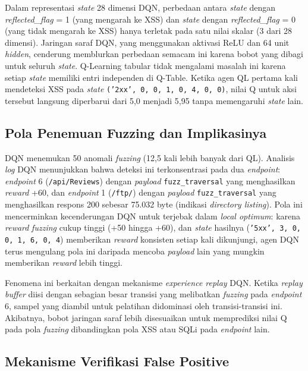 Dalam representasi \textit{state} 28 dimensi DQN, perbedaan antara \textit{state} dengan \textit{reflected\_flag} = 1 (yang mengarah ke XSS) dan \textit{state} dengan \textit{reflected\_flag} = 0 (yang tidak mengarah ke XSS) hanya terletak pada satu nilai skalar (3 dari 28 dimensi). Jaringan saraf DQN, yang menggunakan aktivasi ReLU dan 64 unit \textit{hidden}, cenderung memblurkan perbedaan semacam ini karena bobot yang dibagi untuk seluruh \textit{state}. Q-Learning tabular tidak mengalami masalah ini karena setiap \textit{state} memiliki entri independen di Q-Table. Ketika agen QL pertama kali mendeteksi XSS pada \textit{state} \texttt{('2xx', 0, 0, 1, 0, 4, 0, 0)}, nilai Q untuk aksi tersebut langsung diperbarui dari 5,0 menjadi 5,95 tanpa memengaruhi \textit{state} lain.

\subsection{Pola Penemuan Fuzzing dan Implikasinya}

DQN menemukan 50 anomali \textit{fuzzing} (12,5 kali lebih banyak dari QL). Analisis \textit{log} DQN menunjukkan bahwa deteksi ini terkonsentrasi pada dua \textit{endpoint}: \textit{endpoint} 6 (\texttt{/api/Reviews}) dengan \textit{payload} \texttt{fuzz\_traversal} yang menghasilkan \textit{reward} +60, dan \textit{endpoint} 1 (\texttt{/ftp/}) dengan \textit{payload} \texttt{fuzz\_traversal} yang menghasilkan respons 200 sebesar 75.032 byte (indikasi \textit{directory listing}). Pola ini mencerminkan kecenderungan DQN untuk terjebak dalam \textit{local optimum}: karena \textit{reward} \textit{fuzzing} cukup tinggi (+50 hingga +60), dan \textit{state} hasilnya (\texttt{'5xx', 3, 0, 0, 1, 6, 0, 4}) memberikan \textit{reward} konsisten setiap kali dikunjungi, agen DQN terus mengulang pola ini daripada mencoba \textit{payload} lain yang mungkin memberikan \textit{reward} lebih tinggi.

Fenomena ini berkaitan dengan mekanisme \textit{experience replay} DQN. Ketika \textit{replay buffer} diisi dengan sebagian besar transisi yang melibatkan \textit{fuzzing} pada \textit{endpoint} 6, sampel yang diambil untuk pelatihan didominasi oleh transisi-transisi ini. Akibatnya, bobot jaringan saraf lebih disesuaikan untuk memprediksi nilai Q pada pola \textit{fuzzing} dibandingkan pola XSS atau SQLi pada \textit{endpoint} lain.

\subsection{Mekanisme Verifikasi False Positive}

